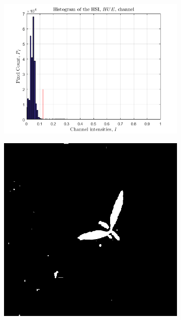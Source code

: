 \begin{figure}[H]
\begin{subfigure}[b]{0.3\textwidth}
		\caption{}
		\label{fig:seg_d}
    \end{subfigure}
    \begin{subfigure}[b]{0.3\textwidth}
        \centering
        \includegraphics[width=\textwidth]{./figure/result/segmentation/imgCLIPPING.png}
		\caption{}
		\label{fig:seg_e}
    \end{subfigure}
    \begin{subfigure}[b]{0.3\textwidth}
        \centering
        \includegraphics[width=\textwidth]{./figure/result/segmentation/imgHSIThreshold.png}

\end{subfigure}
\end{figure}
